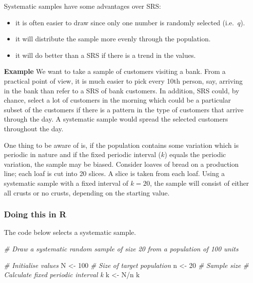 \documentclass[
  oneside]{krantz}
\newenvironment{Shaded}{\begin{snugshade}}{\end{snugshade}}
\newcommand{\CommentTok}[1]{\textcolor[rgb]{0.56,0.35,0.01}{\textit{#1}}}
\newcommand{\DecValTok}[1]{\textcolor[rgb]{0.00,0.00,0.81}{#1}}
\newcommand{\NormalTok}[1]{#1}
\newcommand{\OtherTok}[1]{\textcolor[rgb]{0.56,0.35,0.01}{#1}}
\newcommand{\SpecialCharTok}[1]{\textcolor[rgb]{0.00,0.00,0.00}{#1}}
\begin{document}
Systematic samples have some advantages over SRS:

\begin{itemize}
\item
  it is often easier to draw since only one number is randomly selected (i.e.~\(q\)).
\item
  it will distribute the sample more evenly through the population.
\item
  it will do better than a SRS if there is a trend in the values.
\end{itemize}

\textbf{Example} We want to take a sample of customers visiting a bank. From a practical point of view, it is much easier to pick every 10th person, say, arriving in the bank than refer to a SRS of bank customers. In addition, SRS could, by chance, select a lot of customers in the morning which could be a particular subset of the customers if there is a pattern in the type of customers that arrive through the day. A systematic sample would spread the selected customers throughout the day.

One thing to be aware of is, if the population contains some variation which is periodic in nature and if the fixed periodic interval (\(k\)) equals the periodic variation, the sample may be biased. Consider loaves of bread on a production line; each loaf is cut into 20 slices. A slice is taken from each loaf. Using a systematic sample with a fixed interval of \(k=20\), the sample will consist of either all crusts or no crusts, depending on the starting value.

\hypertarget{doing-this-in-r-1}{%
\subsubsection{Doing this in R}\label{doing-this-in-r-1}}

The code below selects a systematic sample.

\begin{Shaded}
\begin{Highlighting}[]
\CommentTok{\# Draw a systematic random sample of size 20 from a population of 100 units}

\CommentTok{\# Initialise values}
\NormalTok{N }\OtherTok{\textless{}{-}} \DecValTok{100} \CommentTok{\# Size of target population}
\NormalTok{n }\OtherTok{\textless{}{-}} \DecValTok{20} \CommentTok{\# Sample size }
\CommentTok{\# Calculate fixed periodic interval k}
\NormalTok{k }\OtherTok{\textless{}{-}}\NormalTok{ N}\SpecialCharTok{/}\NormalTok{n}
\NormalTok{k}
\end{Highlighting}
\end{Shaded}
\end{document}
